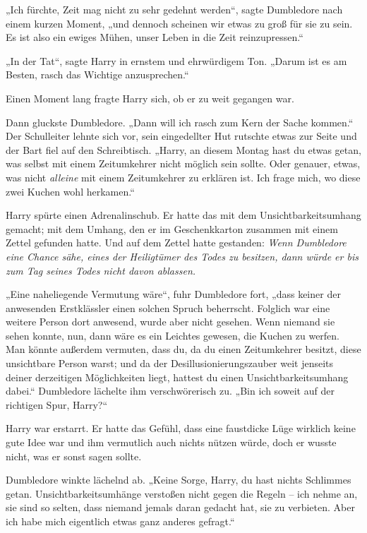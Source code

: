 {„Ich fürchte, Zeit mag nicht zu sehr gedehnt werden“, sagte Dumbledore nach einem kurzen Moment, „und dennoch scheinen wir etwas zu groß für sie zu sein. Es ist also ein ewiges Mühen, unser Leben in die Zeit reinzupressen.“

„In der Tat“, sagte Harry in ernstem und ehrwürdigem Ton. „Darum ist es am Besten, rasch das Wichtige anzusprechen.“

Einen Moment lang fragte Harry sich, ob er zu weit gegangen war.

Dann gluckste Dumbledore. „Dann will ich rasch zum Kern der Sache kommen.“ Der Schulleiter lehnte sich vor, sein eingedellter Hut rutschte etwas zur Seite und der Bart fiel auf den Schreibtisch. „Harry, an diesem Montag hast du etwas getan, was selbst mit einem Zeitumkehrer nicht möglich sein sollte. Oder genauer, etwas, was nicht \emph{alleine} mit einem Zeitumkehrer zu erklären ist. Ich frage mich, wo diese zwei Kuchen wohl herkamen.“

Harry spürte einen Adrenalinschub. Er hatte das mit dem Unsichtbarkeitsumhang gemacht; mit dem Umhang, den er im Geschenkkarton zusammen mit einem Zettel gefunden hatte. Und auf dem Zettel hatte gestanden: \emph{Wenn Dumbledore eine Chance sähe, eines der Heiligtümer des Todes zu besitzen, dann würde er bis zum Tag seines Todes nicht davon ablassen.}

„Eine naheliegende Vermutung wäre“, fuhr Dumbledore fort, „dass keiner der anwesenden Erstklässler einen solchen Spruch beherrscht. Folglich war eine weitere Person dort anwesend, wurde aber nicht gesehen. Wenn niemand sie sehen konnte, nun, dann wäre es ein Leichtes gewesen, die Kuchen zu werfen. Man könnte außerdem vermuten, dass du, da du einen Zeitumkehrer besitzt, diese unsichtbare Person warst; und da der Desillusionierungszauber weit jenseits deiner derzeitigen Möglichkeiten liegt, hattest du einen Unsichtbarkeitsumhang dabei.“ Dumbledore lächelte ihm verschwörerisch zu. „Bin ich soweit auf der richtigen Spur, Harry?“

Harry war erstarrt. Er hatte das Gefühl, dass eine faustdicke Lüge wirklich keine gute Idee war und ihm vermutlich auch nichts nützen würde, doch er wusste nicht, was er sonst sagen sollte.

Dumbledore winkte lächelnd ab. „Keine Sorge, Harry, du hast nichts Schlimmes getan. Unsichtbarkeitsumhänge verstoßen nicht gegen die Regeln -- ich nehme an, sie sind so selten, dass niemand jemals daran gedacht hat, sie zu verbieten. Aber ich habe mich eigentlich etwas ganz anderes gefragt.“

}
